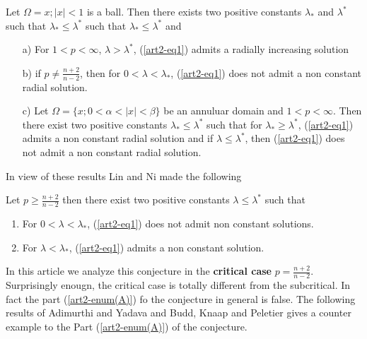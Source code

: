 \begin{theorem}\label{art2-thm1}
Let $\Omega = {x; |x| < 1 }$ is a ball. Then there exists two positive constants $\lambda_{*}$ and $\lambda^{*}$  such that 
$\lambda_{*} \leq \lambda^{*}$ such that $\lambda_{*} \leq \lambda^{*}$ and
\begin{itemize}
\item[a)]For $1< p < \infty$, $\lambda > \lambda^{*}$, (\ref{art2-eq1}) admits a radially increasing solution
\item[b)] if $p \neq \frac{n+2}{n-2}$, then for $0< \lambda <  \lambda_{*}$, (\ref{art2-eq1}) does not admit a non constant radial solution.
\item[c)] Let $\Omega = \{x; 0 < \alpha < |x| < \beta\}$ be an annuluar domain and $ 1 < p < \infty$. Then there exist two positive constants $\lambda_{*} \leq \lambda^{*}$ such that for $\lambda_{*} \geq \lambda^{*}$, (\ref{art2-eq1}) admits a non constant radial solution and if $\lambda \leq \lambda^{*}$, then (\ref{art2-eq1}) does not admit a non constant radial solution. 
\end{itemize}
\end{theorem} 

In view of these results Lin and Ni \cite{art2-key15} made the following

\begin{conjecture*}
Let $p \geq \frac{n+2}{n-2}$ then there exist two positive constants $\lambda \leq \lambda^{*}$ such that
\begin{enumerate}[\rm (A)]
\item For $0 < \lambda < \lambda_{*}$, (\ref{art2-eq1}) does not admit non constant solutions.\label{art2-enum(A)}
\item For $\lambda < \lambda_{*}$, (\ref{art2-eq1}) admits a non constant solution.\label{art2-enum(B)}
\end{enumerate}

 In this article we analyze this conjecture in the \textbf{critical case} $p = \frac{n+2}{n-2}$. Surprisingly enougn, the critical case is totally different from the subcritical. In fact the part (\ref{art2-enum(A)}) fo the conjecture in general is false. The following results of Adimurthi and Yadava \cite{art2-key4} and Budd, Knaap and Peletier \cite{art2-key12} gives a counter example to the Part (\ref{art2-enum(A)}) of the conjecture.
\end{conjecture*}

